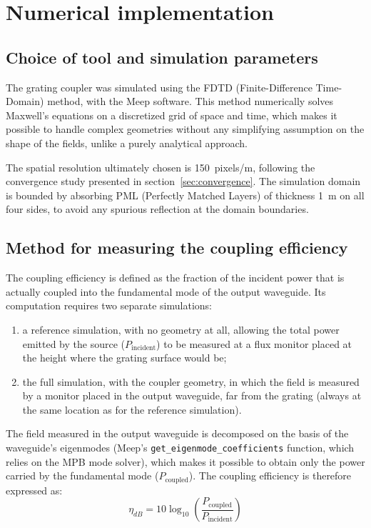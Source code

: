 \documentclass[a4paper,11pt]{report}
\begin{document}
\chapter{Numerical implementation}
\label{ch:numerique}

\section{Choice of tool and simulation parameters}

The grating coupler was simulated using the FDTD (Finite-Difference Time-Domain) method, with the Meep software. This method numerically solves Maxwell's equations on a discretized grid of space and time, which makes it possible to handle complex geometries without any simplifying assumption on the shape of the fields, unlike a purely analytical approach.

The spatial resolution ultimately chosen is 150~pixels/\textmu m, following the convergence study presented in section~\ref{sec:convergence}. The simulation domain is bounded by absorbing PML (Perfectly Matched Layers) of thickness 1~\textmu m on all four sides, to avoid any spurious reflection at the domain boundaries.

\section{Method for measuring the coupling efficiency}

The coupling efficiency is defined as the fraction of the incident power that is actually coupled into the fundamental mode of the output waveguide. Its computation requires two separate simulations:

\begin{enumerate}
    \item a reference simulation, with no geometry at all, allowing the total power emitted by the source ($P_{\text{incident}}$) to be measured at a flux monitor placed at the height where the grating surface would be;
    \item the full simulation, with the coupler geometry, in which the field is measured by a monitor placed in the output waveguide, far from the grating (always at the same location as for the reference simulation).
\end{enumerate}

The field measured in the output waveguide is decomposed on the basis of the waveguide's eigenmodes (Meep's \texttt{get\_eigenmode\_coefficients} function, which relies on the MPB mode solver), which makes it possible to obtain only the power carried by the fundamental mode ($P_{\text{coupled}}$). The coupling efficiency is therefore expressed as:
\begin{equation}
\eta_{dB} = 10\log_{10}\left(\frac{P_{\text{coupled}}}{P_{\text{incident}}}\right)
\label{eq:efficacite}
\end{equation}
\end{document}
